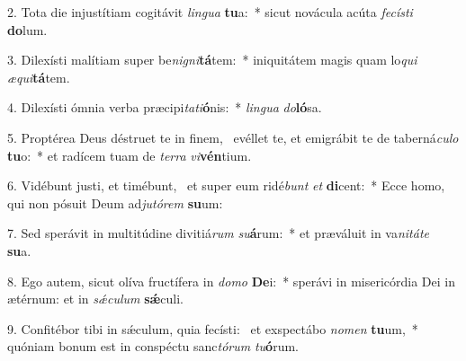 2. Tota die injustítiam cogitávit \textit{lin}\textit{gua} \textbf{tu}a:~*  sicut novácula acúta \textit{fe}\textit{cís}\textit{ti} \textbf{do}lum.\

3. Dilexísti malítiam super be\textit{ni}\textit{gni}\textbf{tá}tem:~*  iniquitátem magis quam lo\textit{qui} \textit{æ}\textit{qui}\textbf{tá}tem.\

4. Dilexísti ómnia verba præcipi\textit{ta}\textit{ti}\textbf{ó}nis:~*  \textit{lin}\textit{gua} \textit{do}\textbf{ló}sa.\

5. Proptérea Deus déstruet te in finem, \dag\  evéllet te, et emigrábit te de taberná\textit{cu}\textit{lo} \textbf{tu}o:~*  et radícem tuam de \textit{ter}\textit{ra} \textit{vi}\textbf{vén}tium.\

6. Vidébunt justi, et timébunt, \dag\  et super eum ridé\textit{bunt} \textit{et} \textbf{di}cent:~*  Ecce homo, qui non pósuit Deum ad\textit{ju}\textit{tó}\textit{rem} \textbf{su}um:\

7. Sed sperávit in multitúdine divitiá\textit{rum} \textit{su}\textbf{á}rum:~*  et præváluit in va\textit{ni}\textit{tá}\textit{te} \textbf{su}a.\

8. Ego autem, sicut olíva fructífera in \textit{do}\textit{mo} \textbf{De}i:~*  sperávi in misericórdia Dei in ætérnum: et in \textit{sǽ}\textit{cu}\textit{lum} \textbf{sǽ}culi.\

9. Confitébor tibi in sǽculum, quia fecísti: \dag\  et exspectábo \textit{no}\textit{men} \textbf{tu}um,~*  quóniam bonum est in conspéctu sanc\textit{tó}\textit{rum} \textit{tu}\textbf{ó}rum.\

